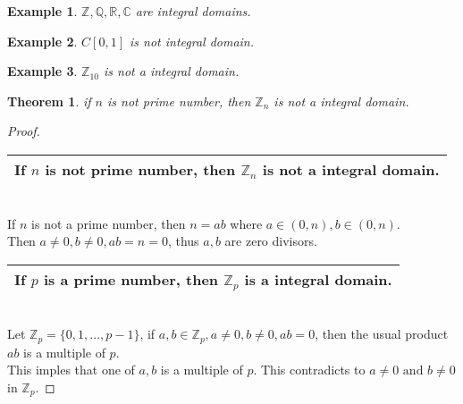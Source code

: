 \documentclass{article}
\theoremstyle{MyNonumberplain}
\theoremstyle{break}
\newtheorem*{proof}{Proof. }
\newcommand{\infixand}{\text{ and }}
\theoremstyle{break}
\newtheorem{theorem}{Theorem}[section]
\newtheorem{example}{Example}[section]
\theoremstyle{break}
\theoremstyle{definition}
\theoremstyle{break}
\begin{document}
\begin{expbox}
    \begin{example}
        $\mathbb{Z}, \mathbb{Q}, \mathbb{R}, \mathbb{C}$ are integral domains.
    \end{example}
\end{expbox}

\begin{expbox}
    \begin{example}
        $C [0, 1]$ is not integral domain.
    \end{example}
\end{expbox}

\begin{expbox}
    \begin{example}
        $\mathbb{Z}_{10}$ is not a integral domain.
    \end{example}
\end{expbox}

\begin{thmbox}
    \begin{theorem}
        if $n$ is not prime number, then $\mathbb{Z}_n$ is not a integral domain.
    \end{theorem}
    \begin{prfbox}
        \begin{proof}
            \begin{tabular}{|c|}
                \hline
                If $n$ is not prime number, then $\mathbb{Z}_n$ is not a integral domain.\\
                \hline
              \end{tabular}\\
              
              If $n$ is not a prime number, then $n = a b$ where $a \in (0, n), b \in (0,
              n)$.\\
              
              Then $a \neq 0, b \neq 0, a b = n = 0$, thus $a, b$ are zero divisors.\\
              
              \begin{tabular}{|c|}
                \hline
                If $p$ is a prime number, then $\mathbb{Z}_p$ is a integral domain.\\
                \hline
              \end{tabular}\\
              
              Let $\mathbb{Z}_p = \{ 0, 1, \ldots, p - 1 \}$, if $a, b \in \mathbb{Z}_p, a
              \neq 0, b \neq 0, a b = 0$, then the usual product $a b$ is a multiple of $p$.\\
              
              This imples that one of $a, b$ is a multiple of $p$. This contradicts to $a
              \neq 0 \infixand b \neq 0$ in $\mathbb{Z}_p$.
        \end{proof}
    \end{prfbox}
\end{thmbox}
\end{document}
